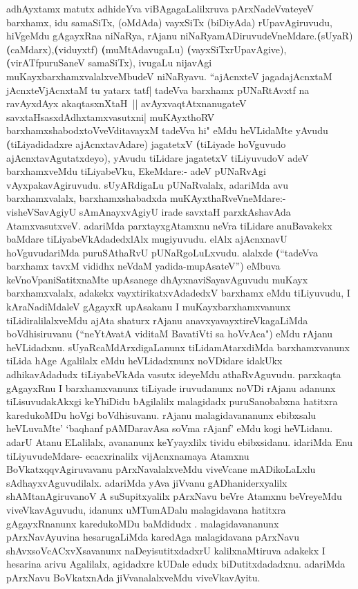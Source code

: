 \begin{artha}
adhAyxtamx matutx adhideYva viBAgagaLalilxruva pArxNadeVvateyeV barxhamx, idu  samaSiTx, (oMdAda) vayxSiTx (biDiyAda) rUpavAgiruvudu, hiVgeMdu gAgayxRna niNaRya, rAjanu niNaRyamADiruvudeVneMdare.\textbf(sUyaR) \textbf(caMdarx),\textbf(viduyxtf) \textbf(muMtAdavugaLu) \textbf(vayxSiTxrUpavAgive),\textbf(virATfpuruSaneV samaSiTx), ivugaLu nijavAgi muKayxbarxhamxvalalxveMbudeV niNaRyavu. ``ajAcnxteV jagadajAcnxtaM jAcnxteV\-jAcnxtaM tu yatarx tatf| tadeVva barxhamx pUNaRtAvxtf na ravAyxdAyx akaqtasxnXtaH~|| avAyxvaqtAtxnanugateV savxtaHsasxdAdhxtamxvasutxni| muKAyxthoRV barxhamxshabodx\s toV\break veVditavayxM tadeVva hi" eMdu heVLidaMte yAvudu \textbf(tiLiyadidadxre ajAcnxtavAdare) jagatetxV  \textbf(tiLiyade hoVguvudo ajAcnxtavAgutatxdeyo), yAvudu tiLidare jagatetxV tiLiyuvudoV adeV barxhamxveMdu tiLiyabeVku, EkeMdare:- adeV pUNaRvAgi  vAyxpakavAgiruvudu. sUyARdigaLu pUNaRvalalx, adariMda avu barxhamxvalalx, barxhamxshabadxda muKAyxthaRveVneMdare:- visheVSavAgiyU sAmAnayxvAgiyU irade savxtaH parxkAshavAda AtamxvasutxveV. adariMda parxtayxgAtamxnu neVra tiLidare anuBavakekx baMdare tiLiyabeVkAdadedxlAlx mugiyuvudu. elAlx ajAcnxnavU hoVguvudariMda puruSAthaRvU pUNaRgoLuLxvudu. alalxde \textbf(``tadeVva barxhamx tavxM vididhx neVdaM yadida-mupAsateV'') eMbuva keVnoVpaniSatitxnaMte upAsanege  dhAyxnaviSayavAguvudu muKayx barxhamxvalalx, adakekx vayxtirikatxvAdadedxV barxhamx eMdu tiLiyuvudu, I kAraNadiMdaleV gAgayxR upAsakanu I muKayxbarxhamxvanunx tiLidiralilalxveMdu ajAta shaturx rAjanu anavxyavayxtireVkagaLiMda boVdhisiruvanu \textbf(``neYtAvatA viditaM BavatiVti sa hoVvAca") eMdu rAjanu heVLidadxnu. sUyaRcaMdArxdigaLanunx tiLidamAtarxdiMda barxhamxvanunx tiLida hAge Agalilalx eMdu heVLidadxnunx noVDidare idakUkx adhikavAdadudx tiLiyabeVkAda vasutx ideyeMdu athaRvAguvudu. parxkaqta gAgayxRnu I barxhamxvanunx tiLiyade iruvudanunx noVDi rAjanu adanunx tiLisuvudakAkxgi keYhiDidu bAgilalilx malagidadx puruSanobabxna hatitxra karedukoMDu hoVgi boVdhisuvanu. rAjanu malagidavananunx ebibxsalu heVLuvaMte' `baqhanf pAMDaravAsa soVma rAjanf' eMdu kogi heVLidanu. adarU Atanu ELalilalx, avananunx keYyayxlilx tividu ebibxsidanu. idariMda Enu tiLiyuvudeMdare- ecacxrinalilx vijAcnxnamaya Atamxnu BoVkatxqqvAgiruvavanu pArxNavalalxveMdu viveVcane mADikoLaLxlu sAdhayxvAguvudilalx. adariMda yAva jiVvanu gADhaniderxyalilx shAMtanAgiruvanoV A suSupitxyalilx pArxNavu beVre Atamxnu beVreyeMdu viveVkavAguvudu, idanunx uMTumADalu malagidavana hatitxra  gAgayxRnanunx karedukoMDu baMdidudx . malagidavananunx pArxNavAyuvina hesarugaLiMda karedAga malagidavana pArxNavu shAvxsoVcACxvXsavanunx naDeyisutitxdadxrU kalilxnaMtiruva adakekx I hesarina arivu Agalilalx, agidadxre kUDale edudx biDutitxdadadxnu. adariMda pArxNavu BoVkatxnAda jiVvanalalxveMdu viveVkavAyitu. 
\end{artha}

